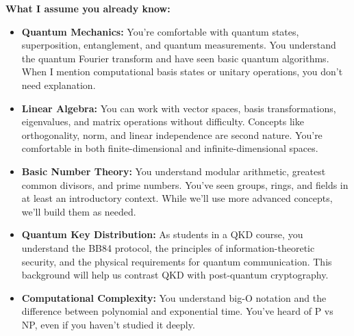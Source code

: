 \documentclass[11pt,a4paper]{article}
\begin{document}
\textbf{What I assume you already know:}
\begin{itemize}
    \item \textbf{Quantum Mechanics:} You're comfortable with quantum states, superposition, entanglement, and quantum measurements. You understand the quantum Fourier transform and have seen basic quantum algorithms. When I mention computational basis states or unitary operations, you don't need explanation.
    
    \item \textbf{Linear Algebra:} You can work with vector spaces, basis transformations, eigenvalues, and matrix operations without difficulty. Concepts like orthogonality, norm, and linear independence are second nature. You're comfortable in both finite-dimensional and infinite-dimensional spaces.
    
    \item \textbf{Basic Number Theory:} You understand modular arithmetic, greatest common divisors, and prime numbers. You've seen groups, rings, and fields in at least an introductory context. While we'll use more advanced concepts, we'll build them as needed.
    
    \item \textbf{Quantum Key Distribution:} As students in a QKD course, you understand the BB84 protocol, the principles of information-theoretic security, and the physical requirements for quantum communication. This background will help us contrast QKD with post-quantum cryptography.
    
    \item \textbf{Computational Complexity:} You understand big-O notation and the difference between polynomial and exponential time. You've heard of P vs NP, even if you haven't studied it deeply.
\end{itemize}
\end{document}
